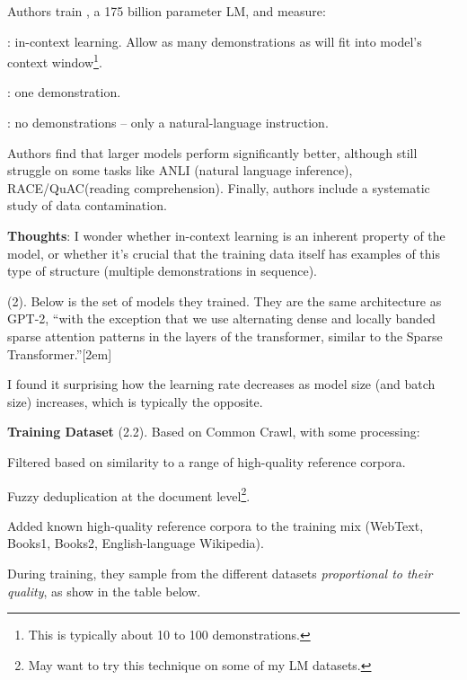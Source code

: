 \documentclass[11pt]{article}
\begin{document}

Authors train , a 175 billion parameter LM, and measure:
\begin{compactitem}
    \item {}: in-context learning. Allow as many demonstrations as will fit into model's context window\footnote{This is typically about 10 to 100 demonstrations.}.
    \item {}: one demonstration.
    \item {}: no demonstrations -- only a natural-language instruction.
\end{compactitem}
Authors find that larger models perform significantly better, although still struggle on some tasks like ANLI (natural language inference), RACE/QuAC(reading comprehension). Finally, authors include a systematic study of data contamination.

\textbf{Thoughts}: I wonder whether in-context learning is an inherent property of the model, or whether it's crucial that the training data itself has examples of this type of structure (multiple demonstrations in sequence).

 (2). Below is the set of models they trained. They are the same architecture as GPT-2, ``with the exception that we use alternating dense and locally banded sparse attention patterns in the layers of the transformer, similar to the Sparse Transformer.''[2em]


I found it surprising how the learning rate decreases as model size (and batch size) increases, which is typically the opposite.

\textbf{Training Dataset} (2.2). Based on Common Crawl, with some processing:
\begin{compactenum}
    \item Filtered based on similarity to a range of high-quality reference corpora.
    \item Fuzzy deduplication at the document level\footnote{May want to try this technique on some of my LM datasets.}.
    \item Added known high-quality reference corpora to the training mix (WebText, Books1, Books2, English-language Wikipedia).
\end{compactenum}
During training, they sample from the different datasets \textit{proportional to their quality}, as show in the table below.
\end{document}
